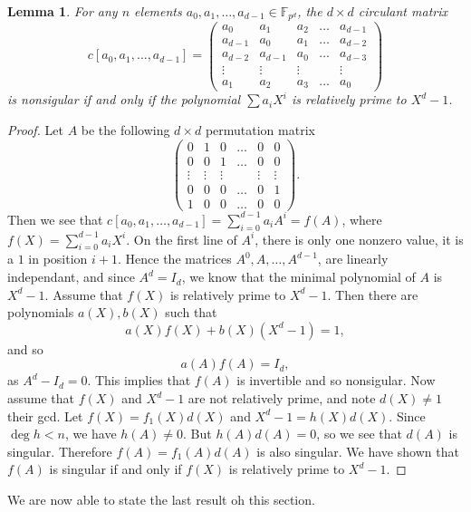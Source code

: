 \documentclass[a4paper,11pt]{article}
\theoremstyle{break}
\newtheorem{lm}[thm]{Lemma}
\theoremstyle{sc}
\theoremstyle{definition}
\theoremstyle{remark}
\begin{document}
\begin{lm}
  \label{henselLm}
  For any $n$ elements $a_0, a_1, \dots, a_{d-1}\in\mathbb{F}_{p^d}$, the
  $d\times d$ circulant matrix
  \[
    c[a_0, a_1, \dots, a_{d-1}] =
    \begin{pmatrix}
      a_0 & a_1 & a_2 & \dots & a_{d-1} \\
      a_{d-1} & a_0 & a_1 & \dots & a_{d-2} \\
      a_{d-2} & a_{d-1} & a_0 & \dots & a_{d-3} \\
      \vdots & \vdots & \vdots & & \vdots \\
      a_1 & a_2 & a_3 & \dots & a_0
    \end{pmatrix}
  \]
  is nonsigular if and only if the polynomial $\sum a_iX^i$ is relatively
  prime to $X^d-1$.
\end{lm}
\begin{proof}
  Let $A$ be the following $d\times d$ permutation matrix 
  \[
    \begin{pmatrix}
      0 & 1 & 0 & \dots & 0 & 0 \\
      0 & 0 & 1 & \dots & 0 & 0 \\
      \vdots & \vdots & \vdots & & \vdots & \vdots \\
      0 & 0 & 0 & \dots & 0 & 1 \\
      1 & 0 & 0 & \dots & 0 & 0
    \end{pmatrix}.
  \]
  Then we see that $c[a_0, a_1, \dots, a_{d-1}] =
  \sum_{i=0}^{d-1}a_iA^i=f(A)$, where $f(X)=\sum_{i=0}^{d-1}a_iX^i$. On the
  first line of $A^i$, there is only one nonzero value, it is a $1$ in
  position $i+1$. Hence the matrices $A^0, A, \dots, A^{d-1}$, are linearly
  independant, and since $A^d=I_d$, we know that the minimal polynomial
  of $A$ is $X^d-1$. Assume that $f(X)$ is relatively prime to $X^d-1$. Then
  there are polynomials $a(X), b(X)$ such that
  \[ 
  a(X)f(X) + b(X)(X^d-1)=1,
\]
and so
\[
  a(A)f(A) = I_d,
\]
as $A^d-I_d=0$. This implies that $f(A)$ is invertible and so
nonsigular. Now assume that $f(X)$ and $X^d-1$ are not relatively prime, and
note $d(X)\neq1$ their gcd. Let $f(X)=f_1(X)d(X)$ and $X^d-1=h(X)d(X)$.
Since $\deg h < n$, we have $h(A)\neq0$. But $h(A)d(A)=0$, so we see that
$d(A)$ is singular. Therefore $f(A)=f_1(A)d(A)$ is also singular. We have shown
that $f(A)$ is singular if and only if $f(X)$ is relatively prime to $X^d-1$.
\end{proof}

We are now able to state the last result oh this section.
\end{document}
